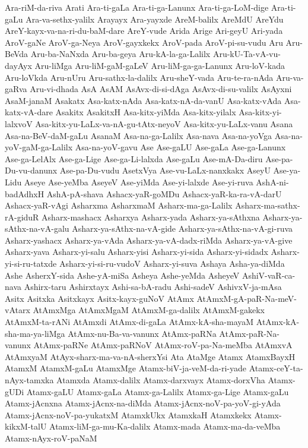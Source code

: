 {Ara-riM-da-riva
Arati
Ara-ti-gaLa
Ara-ti-ga-Lanunx
Ara-ti-ga-LoM-dige
Ara-ti-gaLu
Ara-va-sethx-yalilx
Arayayx
Ara-yayxde
AreM-balilx
AreMdU
AreYdu
AreY-kayx-va-na-ri-du-baM-dare
AreY-vude
Arida
Arige
Ari-geyU
Ari-yada
AroV-gaNe
AroV-ga-Neya
AroV-gayxkekx
AroV-pada
AroV-pi-su-vudu
Aru
Aru-BeVda
Aru-ba-NaNxda
Aru-ba-geya
Aru-kA-la-ga-Lalilx
Aru-kU-Ta-vA-vu-dayAyx
Aru-liMga
Aru-liM-gaM-gaLeV
Aru-liM-ga-ga-Lanunx
Aru-loV-kada
Aru-loVkda
Aru-nUru
Aru-sathx-la-dalilx
Aru-sheY-vada
Aru-te-ra-nAda
Aru-va-gaRva
Aru-vi-dhada
AsA
AsAM
AsAvx-di-si-dAga
AsAvx-di-su-valilx
AsAyxni
AsaM-janaM
Asakatx
Asa-katx-nAda
Asa-katx-nA-da-vanU
Asa-katx-vAda
Asa-katx-vA-dare
Asakitx
AsakitxH
Asa-kitx-yiMda
Asa-kitx-yilalx
Asa-kitx-yi-lalxvoV
Asa-kitx-yu-LaLx-va-nA-gu-tAtx-neyoV
Asa-kitx-yu-LaLx-vanu
Asana
Asa-na-BeV-daM-gaLu
AsanaM
Asa-na-ga-Lalilx
Asa-nava
Asa-na-yoVga
Asa-na-yoV-gaM-ga-Lalilx
Asa-na-yoV-gavu
Ase
Ase-gaLU
Ase-gaLa
Ase-ga-Lanunx
Ase-ga-LelAlx
Ase-ga-Lige
Ase-ga-Li-lalxda
Ase-gaLu
Ase-mA-Da-diru
Ase-pa-Du-vu-danunx
Ase-pa-Du-vudu
AsetxVya
Ase-vu-LaLx-nanxkakx
AseyU
Ase-ya-Lidu
Aseye
Ase-yeMba
AseyeV
Ase-yiMda
Ase-yi-lalxde
Ase-yi-ruva
AshA-ni-badAdhxH
AshA-pA-shava
Ashacx-yaR-goMDu
Ashacx-yaR-ka-ra-vA-darU
Ashacx-yaR-vAgi
Asharxma
AsharxmaM
Asharx-ma-ga-Lalilx
Asharx-ma-sathx-rA-giduR
Asharx-mashacx
Asharxya
Asharx-yada
Asharx-ya-sAthxna
Asharx-ya-sAthx-na-vA-galu
Asharx-ya-sAthx-na-vA-gide
Asharx-ya-sAthx-na-vA-gi-ruva
Asharx-yashacx
Asharx-ya-vAda
Asharx-ya-vA-dadx-riMda
Asharx-ya-vA-give
Asharx-yava
Asharx-yi-salu
Asharx-yisi
Asharx-yi-sida
Asharx-yi-sidadx
Asharx-yi-si-ru-tatxde
Asharx-yi-si-ru-vudoV
Asharx-yi-suva
Ashaya
Asha-ya-diMda
Ashe
AsherxY-sida
Ashe-yA-miSa
Asheya
Ashe-yeMda
AsheyeV
AshiV-vaR-ca-nava
Ashirx-taru
Ashirxtayx
Ashi-sa-bA-radu
Ashi-sadeV
AshivxV-ja-mAsa
Asitx
Asitxka
Asitxkayx
Asitx-kayx-guNoV
AtAmx
AtAmxM-gA-paR-Na-meV-vAtarx
AtAmxMga
AtAmxMgaM
AtAmxM-ga-dalilx
AtAmxM-gakekx
AtAmxM-ta-rANi
AtAmxdi
AtAmx-di-gaLa
AtAmx-kA-sha-mayaM
AtAmx-kA-sha-ma-ya-liMga
AtAmx-nu-Ba-va-vanunx
AtAmx-paRNa
AtAmx-paR-Na-vanunx
AtAmx-paRNe
AtAmx-paRNoV
AtAmx-roV-pa-Na-meMba
AtAmxvA
AtAmxyaM
AtAyx-sharx-ma-va-nA-sherxYsi
Ata
AtaMge
Atamx
AtamxBayxH
AtamxM
AtamxM-gaLu
AtamxMge
Atamx-biV-ja-veM-da-ri-yade
Atamx-ceY-ta-nAyx-tamxka
Atamxda
Atamx-dalilx
Atamx-darxvayx
Atamx-dorxVha
Atamx-gUDi
Atamx-gaLU
Atamx-gaLa
Atamx-ga-Lalilx
Atamx-ga-Lige
Atamx-gaLu
Atamx-jAcnxna
Atamx-jAcnx-na-diMda
Atamx-jAcnx-noV-pa-yoV-gi-yAda
Atamx-jAcnx-noV-pa-yukatxM
AtamxkUkx
AtamxkaH
Atamxkekx
Atamx-kikxM-talU
Atamx-liM-ga-mu-Ka-dalilx
Atamx-mada
Atamx-ma-da-veMba
Atamx-nAyx-roV-paNaM
}
